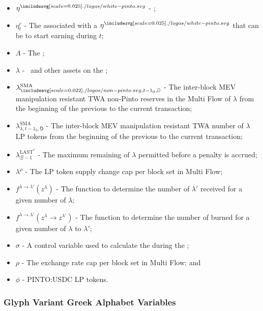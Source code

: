 \documentclass[class=article, crop=false]{standalone}
\begin{document}
\begin{itemize}[topsep=0pt, itemsep=3pt,leftmargin=16pt]
    \item[] $\eta^{\pinto}$ -  \Pinto;
    \item[] $\eta_{t}^{c}$ - The  associated with a  $\eta^{\pinto}$ that can be  to start earning  during $t$;
    \item[] $\Lambda$ - The ;
    \item[] $\lambda$ - \Pinto\ and other assets on the ;
    \item[] $\lambda_{\nonpinto,{t-1}_0,\Game}^{\text{SMA}}$ - The inter-block MEV manipulation resistant TWA non-Pinto reserves in the Multi Flow  of $\lambda$ from the beginning of the previous  to the current transaction;
    \item[] $\lambda_{\lambda,{t-1}_0,\Game}^{\text{SMA}}$ - The inter-block MEV manipulation resistant TWA number of $\lambda$ LP tokens from the beginning of the previous  to the current transaction;
    \item[] $\lambda_{\Xi-1}^{\text{LAST}^{*}}$ - The maximum remaining  of $\lambda$ permitted before a penalty is accrued;
    \item[] $\lambda^{\rho}$ - The LP token supply change cap per block set in Multi Flow;
    \item[] $f^{\lambda \rightarrow \lambda'}(z^{\lambda})$ - The function to determine the number of $\lambda'$ received for  a given number of $\lambda$;
    \item[] $f^{\lambda \rightarrow \lambda'}(z^{\lambda} \rightarrow z^{\lambda'})$ - The function to determine the number of  burned for  a given number of $\lambda$ to $\lambda'$;
    \item[] $\sigma$ - A control variable used to calculate the  during the ;
    \item[] $\rho$ - The exchange rate cap per block set in Multi Flow; and
    \item[] $\phi$ - PINTO:USDC LP tokens.
\end{itemize}


\subsubsection{Glyph Variant Greek Alphabet Variables}
\end{document}
